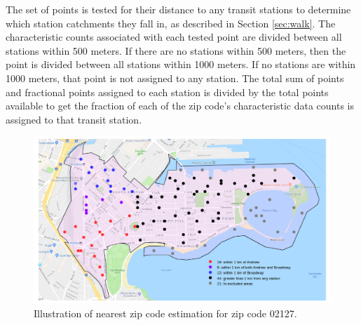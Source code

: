 \documentclass[11pt]{article}
\begin{document}
The set of points is tested for their distance to any transit stations to determine which station catchments they fall in, as described in Section \ref{sec:walk}. The characteristic counts associated with each tested point are divided between all stations within 500 meters. If there are no stations within 500 meters, then the point is divided between all stations within 1000 meters. If no stations are within 1000 meters, that point is not assigned to any station. The total sum of points and fractional points assigned to each station is divided by the total points available to get the fraction of each of the zip code's characteristic data counts is assigned to that transit station. 

\begin{figure}
\begin{center}\includegraphics[scale=0.55]{geo_point_demonstration}\end{center}\caption{Illustration of nearest zip code estimation for zip code 02127.}\label{fig:f1}
\end{figure}
\end{document}

